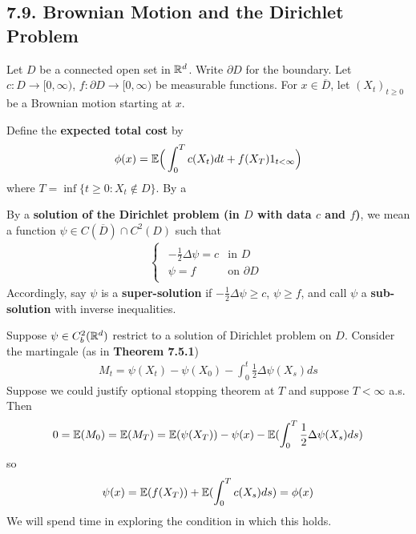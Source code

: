 \documentclass[12pt,a4paper]{report}
\begin{document}
\subsection*{7.9. Brownian Motion and the Dirichlet Problem}

Let $D$ be a connected open set in $\mathbb{R}^d$. Write $\partial D$ for the boundary. Let $c: D \rightarrow [0,\infty)$, $f: \partial D \rightarrow [0,\infty)$ be measurable functions. For $x\in \overline{D}$, let $(X_t)_{t\geq 0}$ be a Brownian motion starting at $x$.

\quad Define the \textbf{expected total cost} by
\begin{align*}
\phi(x) = \mathbb{E} \Big( \int_0^T c(X_t) dt + f(X_T) 1_{t< \infty} \Big)
\end{align*}
where $T = \inf \{ t\geq 0 : X_t \not\in D \}$. By a

\quad By a \textbf{solution of the Dirichlet problem (in $D$ with data $c$ and $f$)}, we mean a function $\psi \in C(\overline{D}) \cap C^2 (D)$ such that
\begin{align*}
\begin{cases}
\begin{array}{ll}
-\frac{1}{2} \Delta \psi = c & \text{in } D \\
\psi = f & \text{on } \partial D
\end{array}
\end{cases}
\end{align*}
Accordingly, say $\psi$ is a \textbf{super-solution} if $-\frac{1}{2} \Delta \psi \geq c$, $\psi \geq f$, and call $\psi$ a \textbf{sub-solution} with inverse inequalities.

\quad Suppose $\psi \in C_b^2(\mathbb{R}^d)$ restrict to a solution of Dirichlet problem on $D$. Consider the martingale (as in \textbf{Theorem 7.5.1})
\begin{align*}
M_t = \psi(X_t) - \psi(X_0) - \int_0^t \frac{1}{2} \Delta \psi (X_s) ds
\end{align*}
Suppose we could justify optional stopping theorem at $T$ and suppose $T< \infty $ a.s. Then
\begin{align*}
0 = \mathbb{E}(M_0) = \mathbb{E}(M_T) = \mathbb{E}(\psi(X_T)) - \psi(x) - \mathbb{E}(\int_0^T \frac{1}{2} \Delta \psi(X_s) ds)
\end{align*} 
so 
\begin{align*}
\psi(x) = \mathbb{E}(f(X_T)) + \mathbb{E}(\int_0^T c(X_s) ds) = \phi(x)
\end{align*}
We will spend time in exploring the condition in which this holds.
\s
\end{document}
